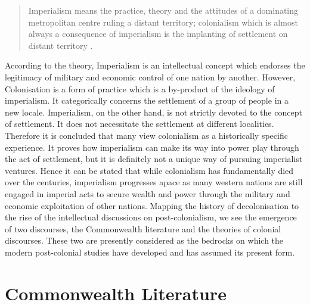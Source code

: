\begin{quote}
    Imperialism  means  the  practice,  theory  and  the  attitudes  of  a  dominating  metropolitan  centre  ruling  a  distant  territory;  colonialism  which  is  almost  always  a  consequence  of  imperialism  is  the  implanting  of  settlement  on  distant  territory \parencite{said}.
\end{quote}

According  to  the  theory,  Imperialism  is  an  intellectual  concept  which  endorses  the  legitimacy  of  military  and  economic  control  of  one  nation  by  another.  However,  Colonisation  is  a  form  of  practice  which  is  a  by-product  of  the  ideology  of  imperialism.  It  categorically  concerns  the  settlement  of  a  group  of  people  in  a  new  locale.  Imperialism,  on  the  other  hand,  is  not  strictly  devoted  to  the  concept  of  settlement.  It  does  not  necessitate  the  settlement  at  different  localities.  Therefore  it  is  concluded  that  many  view  colonialism  as  a  historically  specific  experience.  It  proves  how  imperialism  can  make  its  way  into  power  play  through  the  act  of  settlement,  but  it  is  definitely  not  a  unique  way  of  pursuing  imperialist  ventures.  Hence  it  can  be  stated  that  while  colonialism  has  fundamentally  died  over  the  centuries,  imperialism  progresses  apace  as  many  western  nations  are  still  engaged  in  imperial  acts  to  secure  wealth  and  power  through  the  military  and  economic  exploitation  of  other  nations.  Mapping  the  history  of  decolonisation  to  the  rise  of  the  intellectual  discussions  on  post-colonialism,  we  see  the  emergence  of  two  discourses,  the  Commonwealth  literature  and  the  theories  of  colonial  discourses.  These  two  are  presently  considered  as  the  bedrocks  on  which  the  modern  post-colonial  studies  have  developed  and  has  assumed  its  present  form.

\section{Commonwealth Literature}


